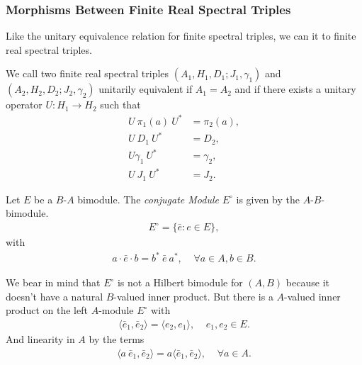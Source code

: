 \subsubsection{Morphisms Between Finite Real Spectral Triples}
Like the unitary equivalence relation for finite spectral triples, we can it
to finite real spectral triples.
\begin{definition}
    We call two finite real spectral triples $(A_1, H_1 ,D_1 ; J_1 , \gamma
    _1)$ and $(A_2, H_2, D_2; J_2, \gamma _2)$ unitarily equivalent if $A_1 =
    A_2$ and if there exists a unitary operator $U: H_1 \rightarrow H_2$ such
    that
    \begin{align}
        U\ \pi_1(a)\ U^* &= \pi _2(a),\\
        U\ D_1\ U^* &= D_2,\\
        U \gamma _1\ U^*  &= \gamma _2,\\
        U\ J_1\ U^* &= J_2.
    \end{align}
\end{definition}
\begin{definition}
    Let $E$ be a $B$-$A$ bimodule. The \textit{conjugate Module} $E^\circ$ is
    given by the $A$-$B$-bimodule.
    \begin{align}
        E^\circ = \{\bar{e} : e\in E\},
    \end{align}
    with
    \begin{align}
    a \cdot \bar{e} \cdot b = b^*\ \bar{e}\ a^*, \;\;\;\; \forall a\in A, b \in
        B.
    \end{align}
\end{definition}
We bear in mind that $E^\circ$ is not a Hilbert bimodule for $(A, B)$ because
it doesn't have a natural $B$-valued inner product. But there is a $A$-valued
inner product on the left $A$-module $E^\circ$ with
\begin{align}
    \langle \bar{e}_1, \bar{e}_2 \rangle = \langle e_2 , e_1 \rangle,
    \;\;\;\; e_1, e_2 \in E.
\end{align}
And linearity in $A$ by the terms
\begin{align}
    \langle a\ \bar{e}_1, \bar{e}_2 \rangle = a \langle \bar{e}_1, \bar{e}_2
    \rangle, \;\;\;\; \forall a \in A.
\end{align}

